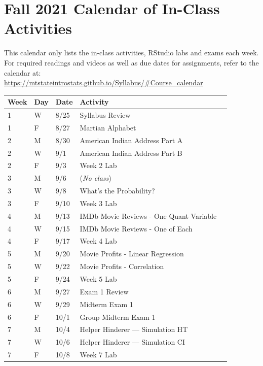 \documentclass[
]{report}
\begin{document}
\nocite{*}

\hypertarget{fall-2021-calendar-of-in-class-activities}{%
\chapter*{Fall 2021 Calendar of In-Class Activities}\label{fall-2021-calendar-of-in-class-activities}}

This calendar only lists the in-class activities, RStudio labs and exams each week. For required readings and videos as well as due dates for assignments, refer to the calendar at:\\
\url{https://mtstateintrostats.github.io/Syllabus/\#Course_calendar}

\begin{longtable}{|l|l|l|l|p{}|}
\hline
\textbf{Week}& \textbf{Day}& \textbf{Date}& \textbf{Activity} \\ \hline
\endhead
1& W& 8/25& Syllabus Review \\*
1& F& 8/27& Martian Alphabet \\ \hline
2& M& 8/30& American Indian Address Part A \\*
2& W& 9/1& American Indian Address Part B \\* 
2& F& 9/3& Week 2 Lab \\ \hline
3& M& 9/6& (\textit{No class}) \\*
3& W& 9/8& What's the Probability? \\*
3& F& 9/10& Week 3 Lab \\ \hline
4& M& 9/13& IMDb Movie Reviews - One Quant Variable \\*
4& W& 9/15& IMDb Movie Reviews - One of Each \\*
4& F& 9/17& Week 4 Lab \\ \hline
5& M& 9/20& Movie Profits - Linear Regression \\*
5& W& 9/22& Movie Profits - Correlation \\* 
5& F& 9/24& Week 5 Lab \\ \hline
6& M& 9/27& Exam 1 Review \\*
6& W& 9/29& Midterm Exam 1 \\*  
6& F& 10/1& Group Midterm Exam 1 \\ \hline
7& M& 10/4& Helper Hinderer --- Simulation HT \\*
7& W& 10/6& Helper Hinderer --- Simulation CI \\*
7& F& 10/8& Week 7 Lab \\ \hline

\end{longtable}
\end{document}
